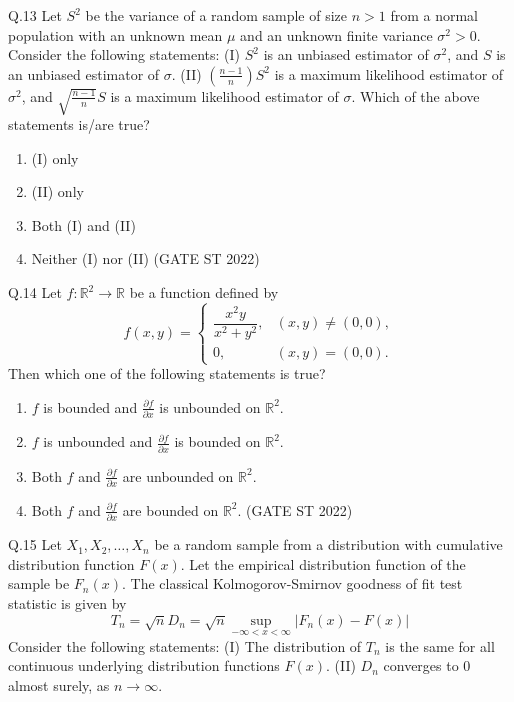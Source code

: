 \documentclass[journal,12pt,onecolumn]{IEEEtran}
\theoremstyle{remark}
\begin{document}
	\vspace{2em}
Q.13 Let $S^2$ be the variance of a random sample of size $n > 1$ from a normal population with an unknown mean $\mu$ and an unknown finite variance $\sigma^2 > 0$. Consider the following statements:
(I) $S^2$ is an unbiased estimator of $\sigma^2$, and $S$ is an unbiased estimator of $\sigma$.
(II) $(\frac{n-1}{n})S^2$ is a maximum likelihood estimator of $\sigma^2$, and $\sqrt{\frac{n-1}{n}}S$ is a maximum likelihood estimator of $\sigma$.
Which of the above statements is/are true?
\begin{enumerate}[label=\alph*.] 
	\item (I) only
	\item (II) only
	\item Both (I) and (II)
	\item Neither (I) nor (II)
	\hfill (GATE ST 2022)
\end{enumerate}
	\vspace{2em}
Q.14 Let $f : \mathbb{R}^2 \to \mathbb{R}$ be a function defined by
\[
f(x,y) =
\begin{cases}
	\dfrac{x^2y}{x^2 + y^2}, & (x,y) \neq (0,0), \\[6pt]
	0, & (x,y) = (0,0).
\end{cases}
\]
Then which one of the following statements is true?
\begin{enumerate}[label=\alph*.] 
	\item $f$ is bounded and $\frac{\partial f}{\partial x}$ is unbounded on $\mathbb{R}^2$.
	\item $f$ is unbounded and $\frac{\partial f}{\partial x}$ is bounded on $\mathbb{R}^2$.
	\item Both $f$ and $\frac{\partial f}{\partial x}$ are unbounded on $\mathbb{R}^2$.
	\item Both $f$ and $\frac{\partial f}{\partial x}$ are bounded on $\mathbb{R}^2$.
	\hfill (GATE ST 2022)
\end{enumerate}
	\vspace{2em}
Q.15 Let $X_1, X_2, \dots, X_n$ be a random sample from a distribution with cumulative distribution function $F(x)$. Let the empirical distribution function of the sample be $F_n(x)$. The classical Kolmogorov-Smirnov goodness of fit test statistic is given by
$$ T_n = \sqrt{n}D_n = \sqrt{n} \sup_{-\infty < x < \infty} | F_n(x) - F(x) | $$
Consider the following statements:
(I) The distribution of $T_n$ is the same for all continuous underlying distribution functions $F(x)$.
(II) $D_n$ converges to 0 almost surely, as $n \to \infty$.
\end{document}
